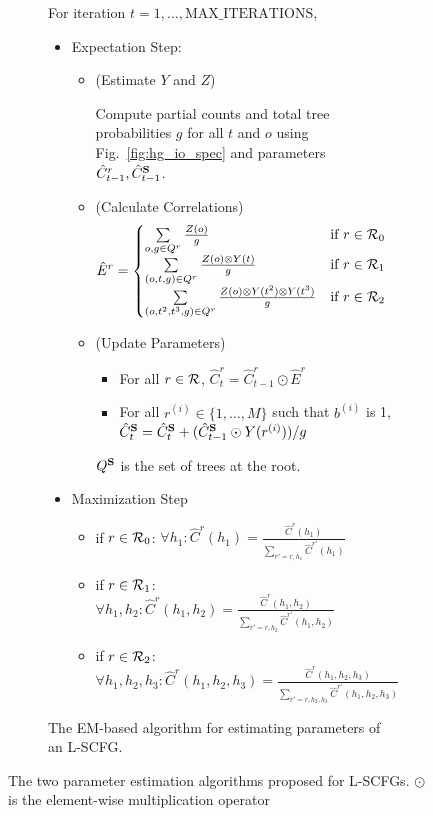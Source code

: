 \documentclass[11pt]{article}
\newcommand{\rione}{r^{(i)}}
\newcommand{\rules}{{\cal R}}
\newcommand{\e}[1]{\hat{#1}}
\newcommand{\bS}{{\bf S}}
\begin{document}
\begin{figure*}[t!]
{\begin{footnotesize}
\begin{subfigure}{1.05\columnwidth}
	For iteration $t=1, \dots, \textrm{MAX\_ITERATIONS}$, 
	\begin{itemize}			
		\item Expectation Step: 
		 \begin{itemize}[label={}]
			\item (Estimate $Y$ and $Z$) 
			
			Compute partial counts and total tree probabilities $g$ for all $t$ and $o$ using Fig.~\ref{fig:hg_io_spec} and parameters $\e{C}_{t-1}^r, \e{C}_{t-1}^\bS$.  
			\item (Calculate Correlations) 
				\begin{align*}
					\e{E}^r &= \begin{cases}
					\sum\limits_{o, g \in Q^r} \frac{Z(o)}{g} &\textrm{if }r \in \rules_0 \\
					\sum\limits_{\left(o, t, g\right) \in Q^r} \frac{Z(o) \otimes Y(t)}{g} &\textrm{if }r \in \rules_1 \\
					\sum\limits_{\left(o,t^2,t^3,g\right) \in Q^r} \frac{Z(o) \otimes Y(t^2) \otimes Y(t^3)}{g} &\textrm{if }r \in \rules_2 
					\end{cases}
				\end{align*}
			\item (Update Parameters)
		 	\begin{itemize}[label={}]
		 		\item For all $r \in \rules$, $\e{C}^r_t = \e{C}^r_{t-1} \odot \e{E}^r$
		 		\item For all $\rione \in \{1, \dots, M\}$ such that $b^{(i)}$ is 1, $\e{C}^\bS_t = \e{C}^\bS_t + (\e{C}^\bS_{t-1} \odot Y(\rione)) / g $
		 	\end{itemize}
		 	$Q^\bS$ is the set of trees at the root.
		\end{itemize}
		\item Maximization Step
			\begin{itemize}[label={},nolistsep]%
				\item if $r \in \rules_0$: $\forall h_1: \e{C}^r(h_1) = \frac{\e{C}^r(h_1)}{\sum_{r'=r, h_1}\e{C}^{r'}(h_1)}$ 
				\item if $r \in \rules_1$: $\forall h_1, h_2: \e{C}^r(h_1, h_2) = \frac{\e{C}^r(h_1, h_2)}{\sum_{r'=r, h_2}\e{C}^{r'}(h_1, h_2)}$ 
				\item if $r \in \rules_2$: $\forall h_1, h_2, h_3: \e{C}^r(h_1, h_2, h_3) = \frac{\e{C}^r(h_1, h_2, h_3)}{\sum_{r'=r,h_2, h_3}\e{C}^{r'}(h_1, h_2, h_3)}$ 
			\end{itemize}
	\end{itemize}		
	\caption{\small The EM-based algorithm for estimating parameters of an L-SCFG.}
	\label{fig:emlearn}	
	\end{subfigure}		
	\end{footnotesize}}
	\caption{The two parameter estimation algorithms proposed for L-SCFGs. $\odot$ is the element-wise multiplication operator}
	\label{fig:estimation-algos}
\end{figure*}
\end{document}
